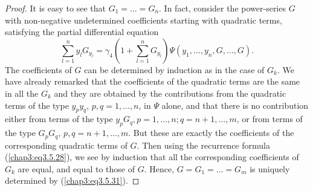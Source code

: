 \begin{proof}
It is easy to see that $G_1 = \ldots = G_n$. In fact, consider the
power-series $G$ with non-negative undetermined coefficients starting
with qua\-dratic terms, satisfying the partial differential equation 
\begin{equation*}
\sum\limits^n_{l=1} y_l G_{y_l} = \gamma_4 \left( 1+
\sum\limits^n_{l=1} G_{y_l}\right) \Psi (y_1, \ldots, y_n, G, \ldots,
G). \tag{3.5.31}\label{chap3:eq3.5.31} 
\end{equation*}
The coefficients of $G$ can be determined by induction as in the case
of $G_k$. We have already remarked that the coefficients of the
quadratic terms are the same in all the $G_k$ and they are obtained by
the contributions from the quadratic terms of the type $y_p y_q$, $p,
q =1, \ldots, n$, in $\Psi$ alone, and that there is no contribution
either from terms of the type $y_pG_q, p = 1, \ldots, n; q = n+ 1,
\ldots,m$, or from terms of the type $G_p G_q$, $p, q = n+1,\ldots,
m$. But these are exactly the coefficients of the corresponding
quadratic terms of $G$. Then using the recurrence formula
(\ref{chap3:eq3.5.28}), we see by induction that all the corresponding
coefficients of $G_k$ are equal, and equal to those of $G$. Hence, $G
= G_1 = \ldots = G_m$ is uniquely determined by
(\ref{chap3:eq3.5.31}). 


\end{proof}
